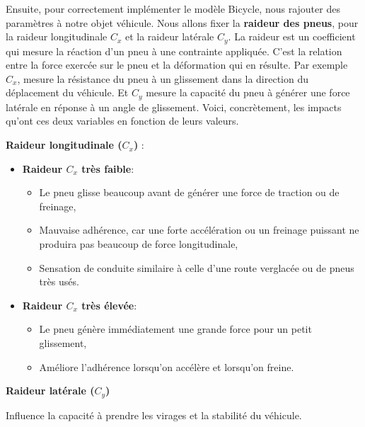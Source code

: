 Ensuite, pour correctement implémenter le modèle Bicycle, nous rajouter des paramètres à notre objet véhicule. Nous allons fixer la \textbf{raideur des pneus}, pour la raideur longitudinale $C_x$ et la raideur latérale $C_y$. La raideur est un coefficient qui mesure la réaction d'un pneu à une contrainte appliquée. C'est la relation entre la force exercée sur le pneu et la déformation qui en résulte. Par exemple $C_x$, mesure la résistance du pneu à un glissement dans la direction du déplacement du véhicule. Et $C_y$ mesure la capacité du pneu à générer une force latérale en réponse à un angle de glissement. Voici, concrètement, les impacts qu'ont ces deux variables en fonction de leurs valeurs.

\textbf{Raideur longitudinale ($C_x$) }:
\begin{itemize}
\item \textbf{Raideur $C_x$ très faible}:
\begin{itemize}[label=$\star$]
\item Le pneu glisse beaucoup avant de générer une force de traction ou de freinage,
\item Mauvaise adhérence, car une forte accélération ou un freinage puissant ne produira pas beaucoup de force longitudinale,
\item Sensation de conduite similaire à celle d’une route verglacée ou de pneus très usés.
\end{itemize}

\item \textbf{Raideur $C_x$ très élevée}:
\begin{itemize}[label=$\star$]
\item Le pneu génère immédiatement une grande force pour un petit glissement,
\item Améliore l’adhérence lorsqu'on accélère et lorsqu'on freine.
\end{itemize}
\end{itemize}

\textbf{Raideur latérale ($C_y$)}

Influence la capacité à prendre les virages et la stabilité du véhicule.

